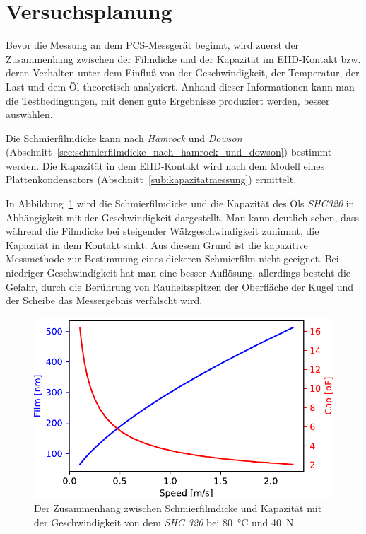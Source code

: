 \section{Versuchsplanung}
\label{sec:versuchsplanung}

Bevor die Messung an dem PCS-Messgerät beginnt, wird zuerst der Zusammenhang zwischen der Filmdicke und der Kapazität im EHD-Kontakt bzw. deren Verhalten unter dem Einfluß von der Geschwindigkeit, der Temperatur, der Last und dem Öl theoretisch analysiert.
Anhand dieser Informationen kann man die Testbedingungen, mit denen gute Ergebnisse produziert werden, besser auswählen.

Die Schmierfilmdicke kann nach \textit{Hamrock} und \textit{Dowson} (Abschnitt~\ref{sec:schmierfilmdicke_nach_hamrock_und_dowson}) bestimmt werden.
Die Kapazität in dem EHD-Kontakt wird nach dem Modell eines Plattenkondensators (Abschnitt~\ref{sub:kapazitatmessung}) ermittelt.

In Abbildung~\ref{fig:filmdicke_kapazitaet_geschwindigkeit} wird die Schmierfilmdicke und die Kapazität des Öls \textit{SHC320} in Abhängigkeit mit der Geschwindigkeit dargestellt.
Man kann deutlich sehen, dass während die Filmdicke bei steigender Wälzgeschwindigkeit zunimmt, die Kapazität in dem Kontakt sinkt.
Aus diesem Grund ist die kapazitive Messmethode zur Bestimmung eines dickeren Schmierfilm nicht geeignet.
Bei niedriger Geschwindigkeit hat man eine besser Auflösung, allerdings besteht die Gefahr, durch die Berührung von Rauheitsspitzen der Oberfläche der Kugel und der Scheibe das Messergebnis verfälscht wird.

\begin{figure}[htb]
    \centering
    \includegraphics[]{./images/film_cap_speed_80C_20N_SHC320.pdf}
    \caption{Der Zusammenhang zwischen Schmierfilmdicke und Kapazität mit der Geschwindigkeit von dem \textit{SHC 320} bei \SI{80}{\degreeCelsius} und \SI{40}{\N}}
    \label{fig:filmdicke_kapazitaet_geschwindigkeit}
\end{figure}

